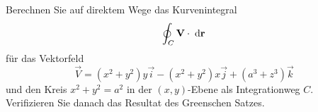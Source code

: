 \begin{atiTask}[
  title = Kurvenintegral mit Polarkoordinaten,
  call = Zusatzaufgabe,
]
Berechnen Sie auf direktem Wege das Kurvenintegral 
\[
\oint_C \mathbf{V}\cdot \;\mathrm{d} \mathbf{r}
\]
für das Vektorfeld 
\[
\vec{V}=(x^2+y^2)y\vec{i}-(x^2+y^2)x\vec{j}+(a^3+z^3)\vec{k}
\]
und den Kreis $x^2+y^2=a^2$ in der $(x,y)$-Ebene als Integrationweg $C$. Verifizieren Sie danach das Resultat des Greenschen Satzes.
\end{atiTask}